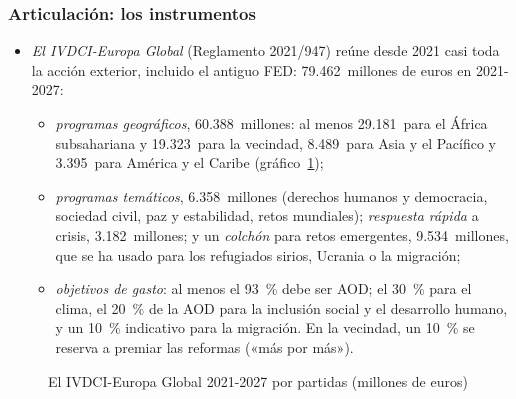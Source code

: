 \documentclass[11pt]{article}
\begin{document}
\begin{infografia}[H]
\centering
\caption{La cooperación al desarrollo de la Unión en el tiempo}\label{figu:cronologia}
\end{infografia}

\subsubsection{Articulación: los instrumentos}\label{sec:instrumentos-coop}

\begin{itemize}
\item \emph{El IVDCI-Europa Global} (Reglamento 2021/947) reúne desde 2021 casi toda la acción exterior, incluido el antiguo FED: 79.462~millones de euros en 2021-2027\nocite{UE2021IVDCI}:
  \begin{itemize}
  \item \emph{programas geográficos}, 60.388~millones: al menos 29.181~para el África subsahariana y 19.323~para la vecindad, 8.489~para Asia y el Pacífico y 3.395~para América y el Caribe (gráfico~\ref{fig:ivdci});
  \item \emph{programas temáticos}, 6.358~millones (derechos humanos y democracia, sociedad civil, paz y estabilidad, retos mundiales); \emph{respuesta rápida} a crisis, 3.182~millones; y un \emph{colchón} para retos emergentes, 9.534~millones, que se ha usado para los refugiados sirios, Ucrania o la migración;
  \item \emph{objetivos de gasto}: al menos el 93~\% debe ser AOD; el 30~\% para el clima, el 20~\% de la AOD para la inclusión social y el desarrollo humano, y un 10~\% indicativo para la migración. En la vecindad, un 10~\% se reserva a premiar las reformas («más por más»).
  \end{itemize}
\end{itemize}

\begin{figure}[H]
\centering
\caption{El IVDCI-Europa Global 2021-2027 por partidas (millones de euros)}\label{fig:ivdci}
\end{figure}
\end{document}
